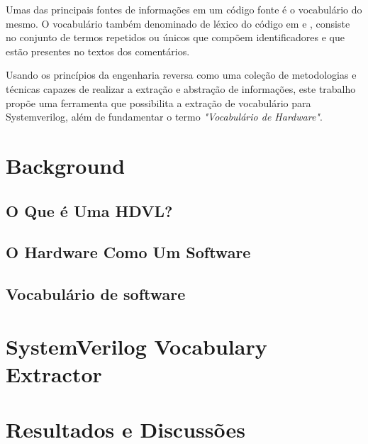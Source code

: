 \documentclass[12pt, twocolumn, a4paper]{article}
\begin{document}
Umas das principais fontes de informações em um código fonte é o vocabulário do mesmo. O vocabulário também denominado de léxico do código em \cite{Host2007} e \cite{Antoniol2007}, consiste no conjunto de termos repetidos ou únicos que compõem identificadores e que estão presentes no textos dos comentários\cite{Abebe2009}.

Usando os princípios da engenharia reversa como uma coleção de metodologias e técnicas capazes de realizar a extração e abstração de informações\cite{BENEDUSI1992225}, este trabalho propõe uma ferramenta que possibilita a extração de vocabulário para Systemverilog, além de fundamentar o termo \textit{"Vocabulário de Hardware"}.

	\section{Background}
	\subsection{O Que é Uma HDVL?}
	\subsection{O Hardware Como Um Software}
	\subsection{Vocabulário de software}
	\section{SystemVerilog Vocabulary Extractor}
	\section{Resultados e Discussões}
	
	
\end{document}
